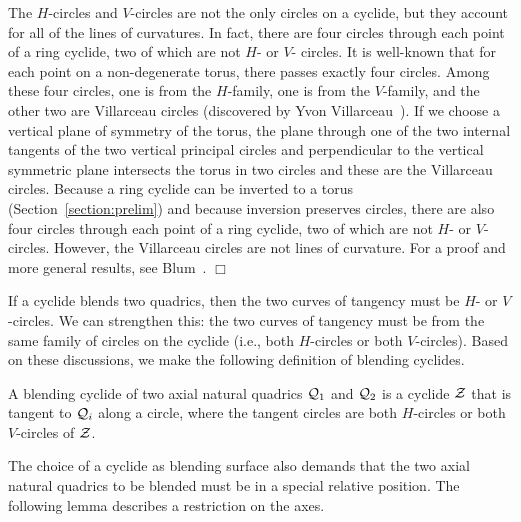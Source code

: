 \begin{remark} \rm
     The $H$-circles and $V$-circles are not the only circles on a cyclide,
but they account for all of the lines of curvatures.   In fact, there are
four circles through each point of a ring cyclide, two of which are not 
$H$- or $V$- circles.  It is well-known that for each point on a non-degenerate
torus, there passes exactly four circles.  Among these four circles, one is 
from the $H$-family, one is from the $V$-family, and the other two are
Villarceau circles (discovered by Yvon Villarceau~\cite{villarceau:1848}).
If we choose a vertical plane of symmetry of the torus, the plane
through one of the two internal tangents of the two vertical principal circles
and perpendicular to the vertical symmetric plane intersects the torus in two
circles and these are the Villarceau circles.  Because a ring cyclide can be
inverted to a torus (Section~\ref{section:prelim}) and because inversion
preserves circles, there are also four circles through each point of a ring
cyclide, two of which are not $H$- or $V$- circles.  However, the 
Villarceau circles are not lines of curvature.  For a proof and more general
results, see Blum~\cite{blum:1980}.   $\Box$
\end{remark}

     If a cyclide blends two quadrics, then the two curves of tangency
must be $H$- or $V$-circles.  We can strengthen this: the two curves of
tangency must be from the same family of circles on the cyclide (i.e., both
$H$-circles or both $V$-circles).  Based on these discussions, we make the 
following definition of blending cyclides.

\begin{definition}
\label{def:interpolating-cyclides}
     A blending cyclide of two axial natural quadrics ${\cal Q}_1$ and 
${\cal Q}_2$ is a cyclide ${\cal Z}$ that is tangent to ${\cal Q}_i$ along a 
circle, where the tangent circles are both $H$-circles or both $V$-circles of 
${\cal Z}$.  
\end{definition}

     The choice of a cyclide as blending surface also demands that the two 
axial natural quadrics to be blended must be in a special relative position.
The following lemma describes a restriction on the axes.

